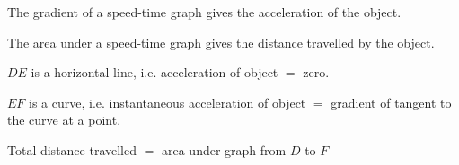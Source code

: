 \documentclass[twocolumn]{article}
\begin{document}
\begin{enumerate}
\noindent 
The gradient of a speed-time graph gives the acceleration of the object.

\noindent 
The area under a speed-time graph gives the distance travelled by the object.

\noindent 
$D E$ is a horizontal line, i.e. acceleration of object $=$ zero.

\noindent 
$E F$ is a curve, i.e. instantaneous acceleration of object $=$ gradient of tangent to the curve at a point.

\noindent 
Total distance travelled $=$ area under graph from $D$ to $F$





\end{enumerate}
\end{document}
